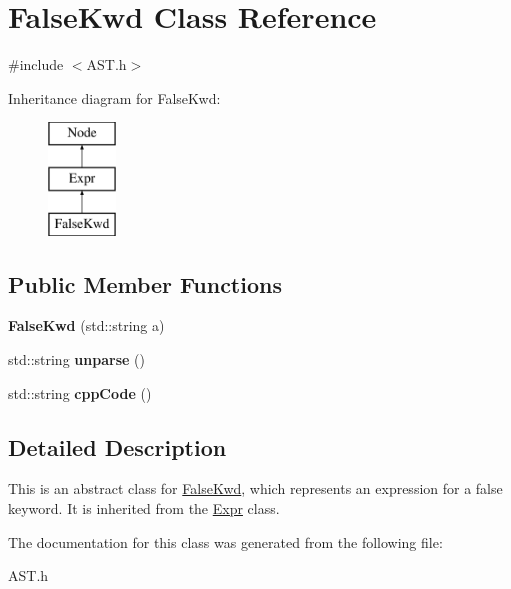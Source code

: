 \hypertarget{class_false_kwd}{}\section{False\+Kwd Class Reference}
\label{class_false_kwd}


{\ttfamily \#include $<$A\+S\+T.\+h$>$}

Inheritance diagram for False\+Kwd\+:\begin{figure}[H]
\begin{center}
\leavevmode
\includegraphics[height=3.000000cm]{class_false_kwd}
\end{center}
\end{figure}
\subsection*{Public Member Functions}
\begin{DoxyCompactItemize}
\item 
\hypertarget{class_false_kwd_a9d4ec3ce8c59065305eac18a64710be2}{}{\bfseries False\+Kwd} (std\+::string a)\label{class_false_kwd_a9d4ec3ce8c59065305eac18a64710be2}

\item 
\hypertarget{class_false_kwd_aacaf1dd65bce5786b6860c5ff03a86a2}{}std\+::string {\bfseries unparse} ()\label{class_false_kwd_aacaf1dd65bce5786b6860c5ff03a86a2}

\item 
\hypertarget{class_false_kwd_ab6ba033479c8eee4c37711ba9dfe668a}{}std\+::string {\bfseries cpp\+Code} ()\label{class_false_kwd_ab6ba033479c8eee4c37711ba9dfe668a}

\end{DoxyCompactItemize}


\subsection{Detailed Description}
This is an abstract class for \hyperlink{class_false_kwd}{False\+Kwd}, which represents an expression for a false keyword. It is inherited from the \hyperlink{class_expr}{Expr} class. 

The documentation for this class was generated from the following file\+:\begin{DoxyCompactItemize}
\item 
A\+S\+T.\+h\end{DoxyCompactItemize}
